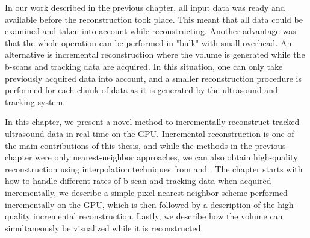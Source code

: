 
In our work described in the previous chapter, all input data was ready and available before the reconstruction took place. This meant that all data could be examined and taken into account while reconstructing. Another advantage was that the whole operation can be performed in "bulk" with small overhead. An alternative is incremental reconstruction where the volume is generated while the b-scans and tracking data are acquired. In this situation, one can only take previously acquired data into account, and a smaller reconstruction procedure is performed for each chunk of data as it is generated by the ultrasound and tracking system.

In this chapter, we present a novel method to incrementally reconstruct tracked ultrasound data in real-time on the GPU. Incremental reconstruction is one of the main contributions of this thesis, and while the methods in the previous chapter were only nearest-neighbor approaches, we can also obtain high-quality reconstruction using interpolation techniques from \cite{coupe2005} and \cite{trobaugh1994}. The chapter starts with how to handle different rates of b-scan and tracking data when acquired incrementally, we describe a simple pixel-nearest-neighbor scheme performed incrementally on the GPU, which is then followed by a description of the high-quality incremental reconstruction. Lastly, we describe how the volume can simultaneously be visualized while it is reconstructed.